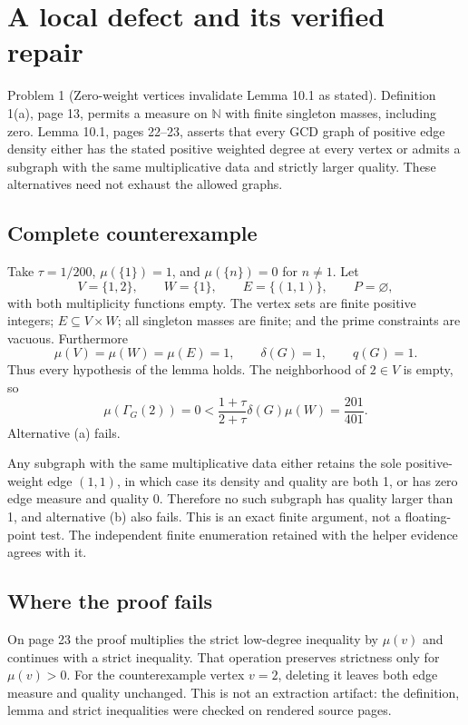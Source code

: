 \documentclass[10pt]{article}
\begin{document}
\section*{A local defect and its verified repair}
Problem 1 (Zero-weight vertices invalidate Lemma 10.1 as stated).  Definition 1(a), page 13, permits a measure on \(\mathbb N\) with finite singleton masses, including zero. Lemma 10.1, pages 22–23, asserts that every GCD graph of positive edge density either has the stated positive weighted degree at every vertex or admits a subgraph with the same multiplicative data and strictly larger quality. These alternatives need not exhaust the allowed graphs.\par
\subsection*{Complete counterexample}
Take \(\tau=1/200\), \(\mu(\{1\})=1\), and \(\mu(\{n\})=0\) for \(n\ne1\). Let \[V=\{1,2\},\qquad W=\{1\},\qquad
 E=\{(1,1)\},\qquad P=\varnothing,\] with both multiplicity functions empty. The vertex sets are finite positive integers; \(E\subseteq V\times W\); all singleton masses are finite; and the prime constraints are vacuous. Furthermore \[\mu(V)=\mu(W)=\mu(E)=1,\qquad \delta(G)=1,\qquad q(G)=1.\] Thus every hypothesis of the lemma holds. The neighborhood of \(2\in V\) is empty, so \[\mu(\Gamma_G(2))=0<
 \frac{1+\tau}{2+\tau}\delta(G)\mu(W)
 =\frac{201}{401}.\] Alternative (a) fails.\par
Any subgraph with the same multiplicative data either retains the sole positive-weight edge \((1,1)\), in which case its density and quality are both 1, or has zero edge measure and quality 0. Therefore no such subgraph has quality larger than 1, and alternative (b) also fails. This is an exact finite argument, not a floating-point test. The independent finite enumeration retained with the helper evidence agrees with it.\par
\subsection*{Where the proof fails}
On page 23 the proof multiplies the strict low-degree inequality by \(\mu(v)\) and continues with a strict inequality. That operation preserves strictness only for \(\mu(v)>0\). For the counterexample vertex \(v=2\), deleting it leaves both edge measure and quality unchanged. This is not an extraction artifact: the definition, lemma and strict inequalities were checked on rendered source pages.\par
\end{document}
